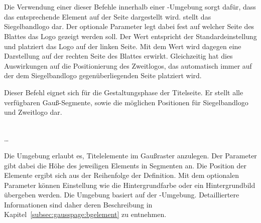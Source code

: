 \begin{Declaration}
  \\
  \\
\end{Declaration}

Die Verwendung einer dieser Befehle innerhalb einer -Umgebung
sorgt dafür, dass das entsprechende Element auf der Seite dargestellt wird.
 stellt das Siegelbandlogo dar. Der optionale Parameter
 legt dabei fest auf welcher Seite des Blattes
das Logo gezeigt werden soll.
Der Wert  entspricht der Standardeinstellung und platziert das Logo auf der linken Seite.
Mit dem Wert  wird dagegen eine Darstellung auf der rechten
Seite des Blattes erwirkt. Gleichzeitig hat dies Auswirkungen
auf die Positionierung des Zweitlogos, das automatisch immer auf der 
dem Siegelbandlogo gegenüberliegenden Seite platziert wird.

\begin{Declaration}
\end{Declaration}

Dieser Befehl eignet sich für die Gestaltungsphase der Titelseite.
Er stellt alle verfügbaren Gauß-Segmente, sowie die möglichen Positionen
für Siegelbandlogo und Zweitlogo dar.

\begin{Declaration}
    \\
  \quad\dots\\
\end{Declaration}

Die Umgebung  erlaubt es, Titelelemente im 
Gaußraster anzulegen. Der Parameter  gibt dabei
die Höhe des jeweiligen Elements in Segmenten an. Die Position der Elemente
ergibt sich aus der Reihenfolge der Definition.
Mit dem optionalen Parameter  können Einstellung wie
die Hintergrundfarbe oder ein Hintergrundbild übergeben werden.
Die Umgebung basiert auf der -Umgebung.
Detailliertere Informationen sind daher deren Beschreibung
in Kapitel~\ref{subsec:gausspage:bgelement} zu entnehmen.

